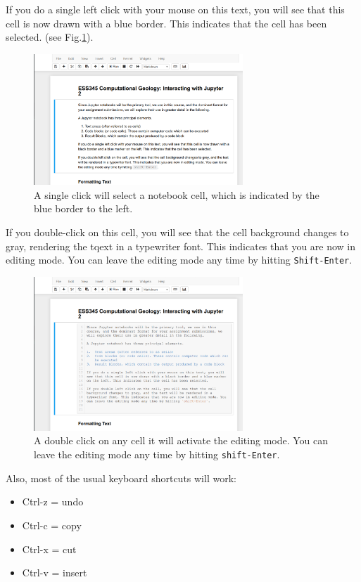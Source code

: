 \documentclass[svgnames, 11pt, lettersize]{article}
\begin{document}
If you do a single left click with your mouse on this text, you will
see that this cell is now drawn with a blue border. This indicates that the cell has been selected.
(see Fig.\ref{nbselected}). 

\begin{figure}[htbp]
\centering
\includegraphics[width=0.7\textwidth]{./figures/Screenshot_20200527_133749.png}
\caption{\label{nbselected}A single click will select a notebook cell, which is indicated by the blue border to the left.}
\end{figure}


If you double-click on this cell, you will see that the cell
background changes to gray, rendering the tqext in a
typewriter font. This indicates that you are now in editing mode. You
can leave the editing mode any time by hitting \texttt{Shift-Enter}.
\begin{figure}[htbp]
\centering
\includegraphics[width=0.7\textwidth]{./figures/Screenshot_20200527_133820.png}
\caption{\label{nbediting}A double click on any cell it will activate the editing mode. You can leave the editing mode any time by hitting \texttt{shift-Enter}.}
\end{figure}

Also, most of the usual keyboard shortcuts will work:
\begin{itemize}
\item Ctrl-z = undo
\item Ctrl-c = copy
\item Ctrl-x = cut
\item Ctrl-v = insert
\end{itemize}
\end{document}
